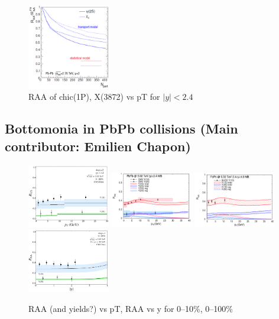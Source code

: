 \documentclass[../report.tex]{subfiles}
\begin{document}
\begin{figure}
\begin{center}
 \includegraphics[width=0.32\textwidth]{fig/theory/chic.png}
\end{center}

 \caption{RAA of chic(1P), X(3872) vs pT for $|y|<2.4$}
\end{figure}



\subsection{Bottomonia in PbPb collisions (Main contributor: Emilien Chapon)}

\begin{figure}
\begin{center}
 \includegraphics[width=0.32\textwidth]{fig/theory/strickland_pt.png}
 \includegraphics[width=0.32\textwidth]{fig/theory/rapp_raa_pt_CMS.png}
 \includegraphics[width=0.32\textwidth]{fig/theory/rapp_raa_pt_ALICE.png}
 \includegraphics[width=0.32\textwidth]{fig/theory/strickland_rap.png}
\end{center}

 \caption{RAA (and yields?) vs pT, RAA vs y for 0--10\%, 0--100\%~\cite{Krouppa:2017jlg,Du:2017qkv} }
\end{figure}
\end{document}
